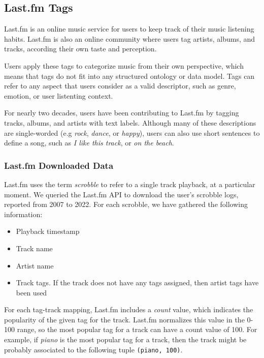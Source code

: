 \documentclass[sn-mathphys]{sn-jnl}%
\theoremstyle{thmstyleone}%
\theoremstyle{thmstyletwo}%
\theoremstyle{thmstylethree}%
\begin{document}
\subsection{Last.fm Tags}

Last.fm is an online music service for users to keep track of their music listening habits.
Last.fm is also an online community where users tag artists, albums, and tracks, according their own taste and perception.

Users apply these tags to
categorize music from their own perspective, which
means that tags do not fit into any structured ontology
or data model.
Tags can refer to any aspect that users consider as a valid descriptor, such as genre,
emotion, or user listenting context.

For nearly two decades, users have been contributing to Last.fm by tagging tracks, albums, and artists with text labels.
Although many of these descriptions are single-worded (e.g \emph{rock}, \emph{dance}, or \emph{happy}),
users can also use short sentences to define a song, such as \emph{I like this track}, or \emph{on the beach}.


\subsubsection{Last.fm Downloaded Data}

Last.fm uses the term \emph{scrobble} to refer to a single track playback,
at a particular moment.
We queried the Last.fm API to download the user{'}s scrobble logs, reported from 2007 to 2022.
For each scrobble, we have gathered the following information:

\begin{itemize}
\item Playback timestamp
\item Track name
\item Artist name
\item Track tags. If the track does not have any tags assigned,
then artist tags have been used
\end{itemize}


For each tag-track mapping, Last.fm includes
a \emph{count} value, which indicates the popularity of the given tag for the track.
Last.fm normalizes this value in the 0-100 range, so the most popular tag for a track can have a
count value of 100.
For example, if \emph{piano} is the most popular tag for a track,
then the track might be probably
associated to the following tuple \verb|(piano, 100)|.
\end{document}
